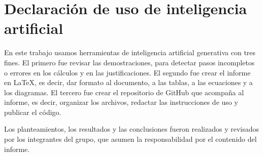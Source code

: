 \section*{Declaración de uso de inteligencia artificial}
\label{sec:declaracion-ia}

En este trabajo usamos herramientas de inteligencia artificial generativa con tres fines.
El primero fue revisar las demostraciones, para detectar pasos incompletos o errores en
los cálculos y en las justificaciones. El segundo fue crear el informe en LaTeX, es decir,
dar formato al documento, a las tablas, a las ecuaciones y a los diagramas. El tercero fue
crear el repositorio de GitHub que acompaña al informe, es decir, organizar los archivos,
redactar las instrucciones de uso y publicar el código.

Los planteamientos, los resultados y las conclusiones fueron realizados y revisados por los
integrantes del grupo, que asumen la responsabilidad por el contenido del informe.

